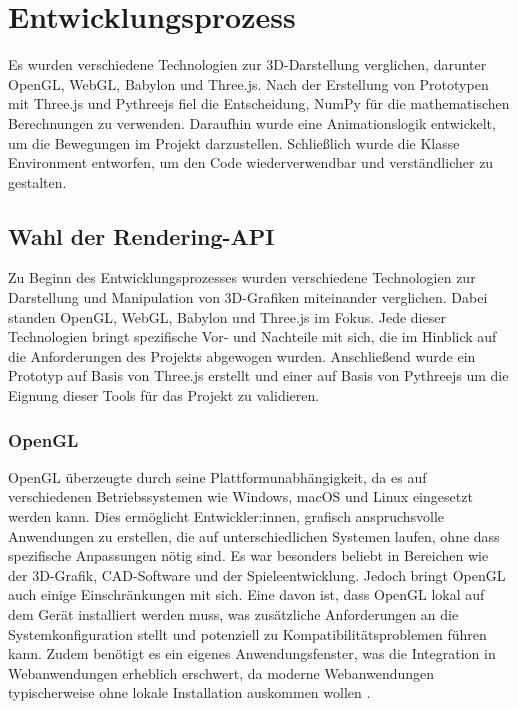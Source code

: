 \section{Entwicklungsprozess}
Es wurden verschiedene Technologien zur 3D-Darstellung verglichen, darunter OpenGL, WebGL, Babylon und Three.js.
Nach der Erstellung von Prototypen mit Three.js und Pythreejs fiel die Entscheidung, NumPy für die mathematischen Berechnungen zu verwenden.
Daraufhin wurde eine Animationslogik entwickelt, um die Bewegungen im Projekt darzustellen. Schließlich wurde die Klasse Environment entworfen,
um den Code wiederverwendbar und verständlicher zu gestalten.

\subsection{Wahl der Rendering-API}
Zu Beginn des Entwicklungsprozesses wurden verschiedene Technologien zur Darstellung und Manipulation von 3D-Grafiken miteinander verglichen.
Dabei standen OpenGL, WebGL, Babylon und Three.js im Fokus.
Jede dieser Technologien bringt spezifische Vor- und Nachteile mit sich, die im Hinblick auf die Anforderungen des Projekts abgewogen wurden.
Anschließend wurde ein Prototyp auf Basis von Three.js erstellt und einer auf Basis von Pythreejs um die Eignung dieser Tools 
für das Projekt zu validieren. 


\subsubsection{OpenGL}
OpenGL überzeugte durch seine Plattformunabhängigkeit, da es auf verschiedenen Betriebssystemen wie Windows, macOS und Linux eingesetzt werden kann.
Dies ermöglicht Entwickler:innen, grafisch anspruchsvolle Anwendungen zu erstellen, die auf unterschiedlichen Systemen laufen, ohne dass spezifische Anpassungen nötig sind.
Es war besonders beliebt in Bereichen wie der 3D-Grafik, CAD-Software und der Spieleentwicklung.
Jedoch bringt OpenGL auch einige Einschränkungen mit sich.
Eine davon ist, dass OpenGL lokal auf dem Gerät installiert werden muss,
was zusätzliche Anforderungen an die Systemkonfiguration stellt und potenziell zu Kompatibilitätsproblemen führen kann.
Zudem benötigt es ein eigenes Anwendungsfenster, was die Integration in Web\-an\-wen\-dung\-en erheblich erschwert,
da moderne Web\-an\-wen\-dung\-en typischerweise ohne lokale Installation auskommen wollen .

